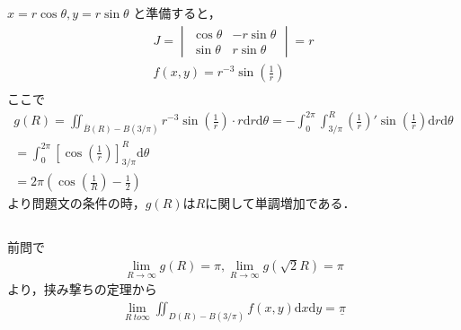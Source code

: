 \documentclass[dvipdfmx]{jsarticle}
\begin{document}
    \subsection{}
      $x = r \cos \theta, y = r \sin \theta$ と準備すると，
      \begin{align*}
        J = 
        \begin{vmatrix}
          \cos \theta & -r\sin \theta \\
          \sin \theta & r \sin \theta
        \end{vmatrix}
        = r\\
        f(x, y) = r ^{-3} \sin \left(\frac{1}{r}\right)\\
      \end{align*}
      ここで
      \begin{align*}
        g(R) = \iint_{\overline{B}(R) - B(3/\pi)} r ^{-3} \sin \left(\frac{1}{r}\right) \cdot r \mathrm{d}r \mathrm{d}\theta
        = -\int_{0}^{2\pi} \int_{3/\pi}^{R} \left(\frac{1}{r}\right)' \sin \left(\frac{1}{r}\right) \mathrm{d}r \mathrm{d}\theta\\
        = \int_{0}^{2\pi} \left[\cos \left(\frac{1}{r}\right)\right]_{3/\pi}^{R}\mathrm{d}\theta\\
        = 2\pi \left(\cos \left(\frac{1}{R}\right) - \frac{1}{2}\right)
      \end{align*}
      より問題文の条件の時，$g(R)$は$R$に関して単調増加である．%
    \subsection{}
      前問で
      \begin{align*}
        \lim_{R \to \infty} g(R) = \pi, \lim_{R \to \infty} g(\sqrt{2}R) = \pi
      \end{align*}
      より，挟み撃ちの定理から
      \begin{align*}
        \lim_{R \ to \infty} \iint_{D(R) - B(3/\pi)} f(x, y) \mathrm{d}x\mathrm{d}y = \underline{\pi}
      \end{align*}
  \section{}
\end{document}
